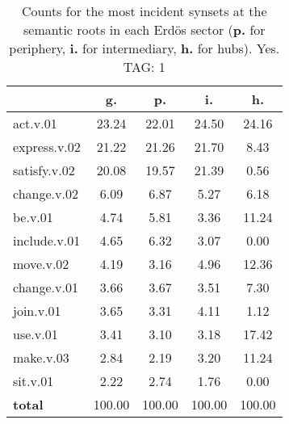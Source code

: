 \begin{table}[h!]
\begin{center}
\begin{tabular}{| l | c | c | c | c |}\hline
 & g. & p. & i. & h. \\\hline
act.v.01 & 23.24  & 22.01  & 24.50  & 24.16 \\\hline
express.v.02 & 21.22  & 21.26  & 21.70  & 8.43 \\\hline
satisfy.v.02 & 20.08  & 19.57  & 21.39  & 0.56 \\\hline
change.v.02 & 6.09  & 6.87  & 5.27  & 6.18 \\\hline
be.v.01 & 4.74  & 5.81  & 3.36  & 11.24 \\\hline
include.v.01 & 4.65  & 6.32  & 3.07  & 0.00 \\\hline
move.v.02 & 4.19  & 3.16  & 4.96  & 12.36 \\\hline
change.v.01 & 3.66  & 3.67  & 3.51  & 7.30 \\\hline
join.v.01 & 3.65  & 3.31  & 4.11  & 1.12 \\\hline
use.v.01 & 3.41  & 3.10  & 3.18  & 17.42 \\\hline
make.v.03 & 2.84  & 2.19  & 3.20  & 11.24 \\\hline
sit.v.01 & 2.22  & 2.74  & 1.76  & 0.00 \\\hline
{{\bf total}} & 100.00  & 100.00  & 100.00  & 100.00 \\\hline
\end{tabular}
\caption{Counts for the most incident synsets at the semantic roots in each Erd\"os sector ({\bf p.} for periphery, {\bf i.} for intermediary, {\bf h.} for hubs). Yes. TAG: 1}
\end{center}
\end{table}